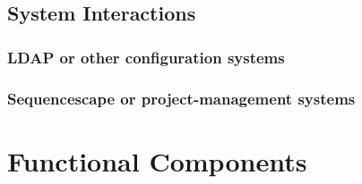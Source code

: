 \documentclass[10pt,a4paper]{article}
\begin{document}
\subsection{System Interactions}
\subsubsection{LDAP or other configuration systems}
\label{sec:interactions:ldap}
\subsubsection{Sequencescape or project-management systems}
\section{Functional Components} 
\printglossaries
\end{document}
